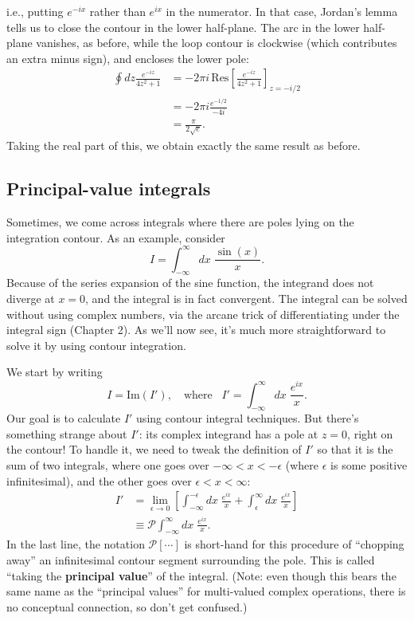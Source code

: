 \documentclass[10pt,a4paper]{article}
\begin{document}
i.e., putting $e^{-ix}$ rather than $e^{ix}$ in the numerator. In that
case, Jordan's lemma tells us to close the contour in the lower
half-plane. The arc in the lower half-plane vanishes, as before, while
the loop contour is clockwise (which contributes an extra minus sign),
and encloses the lower pole:
\begin{align}
  \oint dz \frac{e^{-iz}}{4z^2 + 1}
  &= -2\pi i \, \mathrm{Res}\left[ \frac{e^{-iz}}{4z^2 + 1} \right]_{z = -i/2} \\
  &= - 2\pi i \frac{e^{-1/2}}{-4i} \\ &= \frac{\pi}{2\sqrt{e}}.
\end{align}
Taking the real part of this, we obtain exactly the same result as
before.

\subsection{Principal-value integrals}
\label{principal-value-integrals}

Sometimes, we come across integrals where there are poles lying on the
integration contour. As an example, consider
\begin{equation}
  I = \int_{-\infty}^\infty dx\; \frac{\sin(x)}{x}.
\end{equation}
Because of the series expansion of the sine function, the integrand
does not diverge at $x = 0$, and the integral is in fact
convergent. The integral can be solved without using complex numbers,
via the arcane trick of differentiating under the integral sign
(Chapter 2). As we'll now see, it's much more straightforward to solve
it by using contour integration.

We start by writing
\begin{equation}
I = \mathrm{Im}(I'), \quad \mathrm{where}\;\;\; I' =
\int_{-\infty}^\infty dx\; \frac{e^{ix}}{x}.
\end{equation}
Our goal is to calculate $I'$ using contour integral techniques. But
there's something strange about $I'$: its complex integrand has a pole
at $z = 0$, right on the contour! To handle it, we need to tweak the
definition of $I'$ so that it is the sum of two integrals, where one
goes over $-\infty < x < -\epsilon$ (where $\epsilon$ is some positive
infinitesimal), and the other goes over $\epsilon < x < \infty$:
\begin{align}
  I' &= \lim_{\epsilon \rightarrow 0} \left[ \int_{-\infty}^{-\epsilon} dx\;
    \frac{e^{ix}}{x} + \int_{\epsilon}^\infty dx\; \frac{e^{ix}}{x}\right] \\
  &\equiv \mathcal{P} \int_{-\infty}^\infty dx\; \frac{e^{ix}}{x}.
\end{align}
In the last line, the notation $\mathcal{P}[\cdots]$ is short-hand for
this procedure of ``chopping away'' an infinitesimal contour segment
surrounding the pole. This is called ``taking the \textbf{principal
  value}'' of the integral. (Note: even though this bears the same
name as the ``principal values'' for multi-valued complex operations,
there is no conceptual connection, so don't get confused.)
\end{document}
